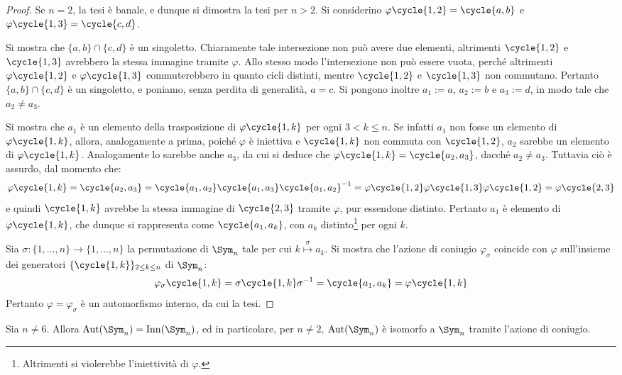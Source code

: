 \documentclass[11pt]{scrartcl}
\begin{document}
	\begin{proof}
		Se $n = 2$, la tesi è banale, e dunque si dimostra la tesi per $n > 2$.
		Si considerino $\varphi\cycle{1, 2} = \cycle{a, b}$ e $\varphi\cycle{1, 3} = \cycle{c, d}$.  \medskip
		

		Si mostra che $\{a, b\} \cap \{c, d\}$ è un singoletto. Chiaramente tale intersezione non può avere
		due elementi, altrimenti $\cycle{1, 2}$ e $\cycle{1, 3}$ avrebbero la stessa immagine tramite
		$\varphi$. Allo stesso modo l'intersezione non può essere vuota, perché altrimenti
		$\varphi\cycle{1, 2}$ e $\varphi\cycle{1, 3}$ commuterebbero in quanto cicli distinti, mentre
		$\cycle{1, 2}$ e $\cycle{1, 3}$ non commutano. Pertanto $\{a, b\} \cap \{c, d\}$ è un singoletto,
		e poniamo, senza perdita di generalità, $a = c$. Si pongono inoltre $a_1 := a$, $a_2 := b$ e
		$a_3 := d$, in modo tale che $a_2 \neq a_3$. \medskip
		
		
		Si mostra che $a_1$ è un elemento della trasposizione di $\varphi\cycle{1, k}$ per ogni $3 < k \leq n$.
		Se infatti $a_1$ non fosse un elemento di $\varphi\cycle{1, k}$, allora, analogamente a prima,
		poiché $\varphi$ è iniettiva e $\cycle{1, k}$ non commuta con $\cycle{1, 2}$, $a_2$ sarebbe un elemento
		di $\varphi\cycle{1, k}$. Analogamente lo sarebbe anche $a_3$, da cui si deduce che $\varphi\cycle{1, k} = \cycle{a_2, a_3}$, dacché $a_2 \neq a_3$. Tuttavia ciò è assurdo, dal momento che:
		\[ \varphi\cycle{1, k} = \cycle{a_2, a_3} = \cycle{a_1, a_2} \cycle{a_1, a_3} \cycle{a_1, a_2}\inv =
		\varphi\cycle{1, 2}\varphi\cycle{1, 3}\varphi\cycle{1, 2} = \varphi\cycle{2, 3} \]
		e quindi $\cycle{1, k}$ avrebbe la stessa immagine di $\cycle{2, 3}$ tramite $\varphi$, pur
		essendone distinto. Pertanto $a_1$ è elemento di $\varphi\cycle{1, k}$, che dunque si rappresenta
		come $\cycle{a_1, a_k}$, con $a_k$ distinto\footnote{
			Altrimenti si violerebbe l'iniettività di $\varphi$.
		} per ogni $k$. \medskip
		
		
		Sia $\sigma : \{1, \ldots, n\} \to \{1, \ldots, n\}$ la permutazione di $\Sym_n$ tale per cui
		$k \overset{\sigma}{\mapsto} a_k$. Si mostra che l'azione di coniugio $\varphi_\sigma$ coincide
		con $\varphi$ sull'insieme dei generatori $\{\cycle{1, k}\}_{2 \leq k \leq n}$ di
		$\Sym_n$:
		\[ \varphi_\sigma\cycle{1, k} = \sigma \cycle{1, k} \sigma\inv = \cycle{a_1, a_k} = \varphi\cycle{1, k}  \]
		Pertanto $\varphi = \varphi_\sigma$ è un automorfismo interno, da cui la tesi.
	\end{proof}
	
	\begin{theorem}
		\label{th:aut_sn}
		Sia $n \neq 6$. Allora $\Aut(\Sym_n) = \Inn(\Sym_n)$, ed in particolare, per
		$n \neq 2$, $\Aut(\Sym_n)$ è isomorfo a $\Sym_n$ tramite l'azione di coniugio.
	\end{theorem}
	
\end{document}
